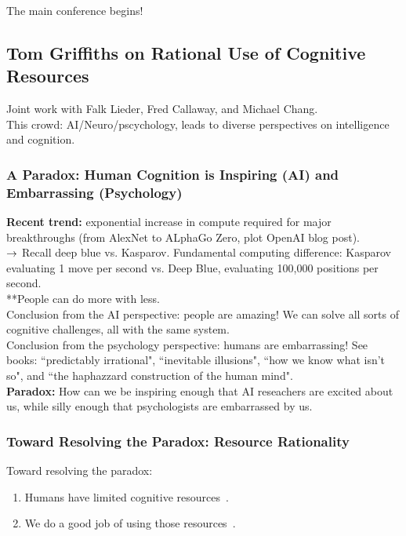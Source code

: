 The main conference begins!

\subsection{Tom Griffiths on Rational Use of Cognitive
Resources}
\label{sec:tg}

Joint work with Falk Lieder, Fred Callaway, and Michael Chang. \\

This crowd: AI/Neuro/pscychology, leads to diverse perspectives on intelligence and cognition.


\subsubsection{A Paradox: Human Cognition is Inspiring (AI) and Embarrassing (Psychology)}

{\bf Recent trend:} exponential increase in compute required for major breakthroughs (from AlexNet to ALphaGo Zero, plot OpenAI blog post). \\

$\rightarrow$ Recall deep blue vs. Kasparov. Fundamental computing difference: Kasparov evaluating 1 move per second vs. Deep Blue, evaluating 100,000 positions per second. \\

**People can do more with less. \\


Conclusion from the AI perspective: people are amazing! We can solve all sorts of cognitive challenges, all with the same system. \\

Conclusion from the psychology perspective: humans are embarrassing! See books: ``predictably irrational", ``inevitable illusions", ``how we know what isn't so", and ``the haphazzard construction of the human mind". \\

{\bf Paradox:} How can we be inspiring enough that AI reseachers are excited about us, while silly enough that psychologists are embarrassed by us.

\subsubsection{Toward Resolving the Paradox: Resource Rationality}

Toward resolving the paradox:
\begin{enumerate}
    \item Humans have limited cognitive resources~\cite{simon1972theories}.
    \item We do a good job of using those resources~\cite{lieder2019resource}.
\end{enumerate}


